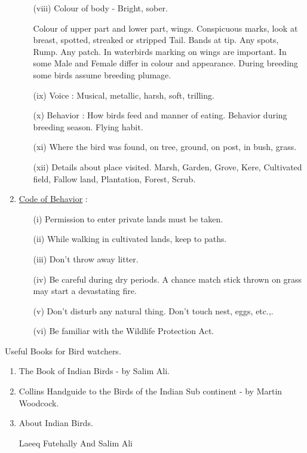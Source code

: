 \begin{enumerate}
\begin{itemize}
\item[(viii)] Colour of body - Bright, sober. 

Colour of upper part and lower part, wings. Conspicuous 
marks, look at breast, spotted, streaked or stripped 
Tail. Bands at tip. Any spots, Rump. Any patch. 
In waterbirds marking on wings are important. In some 
Male and Female differ in colour and appearance. During 
breeding some birds assume breeding plumage. 

\item[(ix)] Voice : Musical, metallic, harsh, soft, trilling. 

\item[(x)] Behavior : How birds feed and manner of eating. Behavior 
during breeding season. Flying habit. 

\item[(xi)] Where the bird was found, on tree, ground, on post, in 
bush, grass. 

\item[(xii)] Details about place visited. Marsh, Garden, Grove, 
Kere, Cultivated field, Fallow land, Plantation, Forest, 
Scrub. 
\end{itemize}

\item \underline{Code of Behavior} : 
\begin{itemize}
\item[(i)] Permission to enter private lands must be taken. 

\item[(ii)] While walking in cultivated lands, keep to paths. 

\item[(iii)] Don't throw away litter. 

\item[(iv)] Be careful during dry periods. A chance match stick 
thrown on grass may start a devastating fire. 

\item[(v)] Don't disturb any natural thing. Don't touch nest, eggs, 
etc.,.

\item[(vi)] Be familiar with the Wildlife Protection Act. 
\end{itemize}
\end{enumerate}

\eject

Useful Books for Bird watchers. 
\begin{enumerate}
\item The Book of Indian Birds - by Salim Ali. 

\item Collins Handguide to the Birds of the Indian Sub continent - by Martin Woodcock. 

\item About Indian Birds. 

Laeeq Futehally And Salim Ali 
\end{enumerate}


